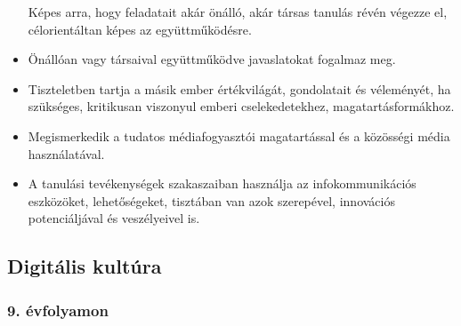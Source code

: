 \begin{itemize}
  Képes arra, hogy feladatait akár önálló, akár társas tanulás révén
  végezze el, célorientáltan képes az együttműködésre.
\item
  Önállóan vagy társaival együttműködve javaslatokat fogalmaz meg.
\item
  Tiszteletben tartja a másik ember értékvilágát, gondolatait és
  véleményét, ha szükséges, kritikusan viszonyul emberi cselekedetekhez,
  magatartásformákhoz.
\item
  Megismerkedik a tudatos médiafogyasztói magatartással és a közösségi
  média használatával.
\item
  A tanulási tevékenységek szakaszaiban használja az infokommunikációs
  eszközöket, lehetőségeket, tisztában van azok szerepével, innovációs
  potenciáljával és veszélyeivel is.
\end{itemize}

\hypertarget{digitalis-kultura}{%
\subsection{Digitális kultúra}\label{digitalis-kultura}}

\hypertarget{evfolyamon-1}{%
\subsubsection{9. évfolyamon}\label{evfolyamon-1}}

